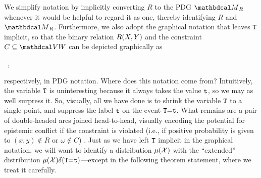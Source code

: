 We simplify notation by implicitly converting $R$ to the PDG $\PDGof{R}$ 
whenever it would be helpful to regard it as one, thereby identifying $R$ and $\PDGof{R}$. 
Furthermore, we also adopt the graphical notation 
that leaves ${\tt T}$ implicit, so that the binary relation $R({X},{Y})$ and the
    constraint $C \subseteq \V \var W$ can be depicted graphically as
\begin{center}
    \hspace{2em}\hspace{2em}
    ~,
\end{center}
respectively, in PDG notation.
Where does this notation come from?
Intuitively, the variable ${\tt T}$ is uninteresting because it always takes the value ${\tt t}$, so we may as well surpress it. 
So, visually, all we have done is to shrink the variable ${\tt T}$ to a single point, and suppress the label ${\tt t}$ on the event ${\tt T}{=}{\tt t}$.
What remains are a pair of double-headed arcs joined head-to-head,
visually encoding the potential for epistemic
    conflict if the constraint is violated
(i.e., if positive probability is given to $(x,y) \notin R$ or $\omega \notin C$)
\unskip.
Just as we have left ${\tt T}$ implicit in the graphical notation,
we will want to identify a distribution $\mu(\mathcal X)$ with 
the ``extended'' distribution $\mu(\mathcal X) \delta({\tt T}{=}{\tt t})$---except
in the following theorem statement, where we treat it carefully.


